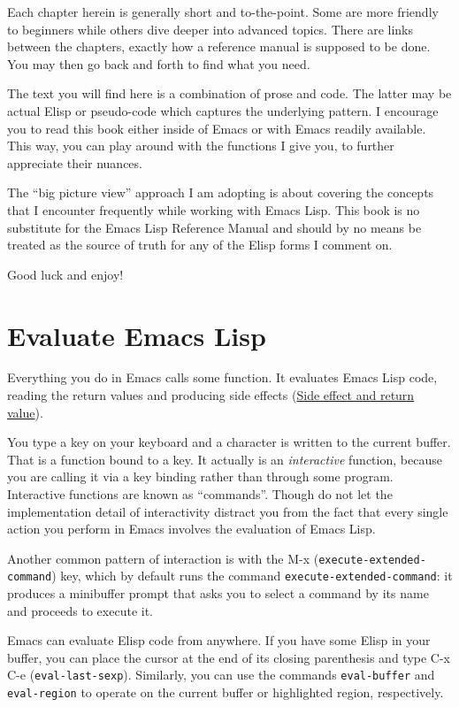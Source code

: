 \documentclass[11pt]{ctexart}
\begin{document}
Each chapter herein is generally short and to-the-point. Some are more friendly to beginners while others dive deeper into advanced topics. There are links between the chapters, exactly how a reference manual is supposed to be done. You may then go back and forth to find what you need.

The text you will find here is a combination of prose and code. The latter may be actual Elisp or pseudo-code which captures the underlying pattern. I encourage you to read this book either inside of Emacs or with Emacs readily available. This way, you can play around with the functions I give you, to further appreciate their nuances.

The ``big picture view'' approach I am adopting is about covering the concepts that I encounter frequently while working with Emacs Lisp. This book is no substitute for the Emacs Lisp Reference Manual and should by no means be treated as the source of truth for any of the Elisp forms I comment on.

Good luck and enjoy!
\section{Evaluate Emacs Lisp}
\label{sec:org91f7fd8}
Everything you do in Emacs calls some function. It evaluates Emacs Lisp code, reading the return values and producing side effects (\hyperref[sec:org2689823]{Side effect and return value}).

You type a key on your keyboard and a character is written to the current buffer. That is a function bound to a key. It actually is an \emph{interactive} function, because you are calling it via a key binding rather than through some program. Interactive functions are known as ``commands''. Though do not let the implementation detail of interactivity distract you from the fact that every single action you perform in Emacs involves the evaluation of Emacs Lisp.

Another common pattern of interaction is with the M-x (\texttt{execute-extended-command}) key, which by default runs the command \texttt{execute-extended-command}: it produces a minibuffer prompt that asks you to select a command by its name and proceeds to execute it.

Emacs can evaluate Elisp code from anywhere. If you have some Elisp in your buffer, you can place the cursor at the end of its closing parenthesis and type C-x C-e (\texttt{eval-last-sexp}). Similarly, you can use the commands \texttt{eval-buffer} and \texttt{eval-region} to operate on the current buffer or highlighted region, respectively.
\end{document}
